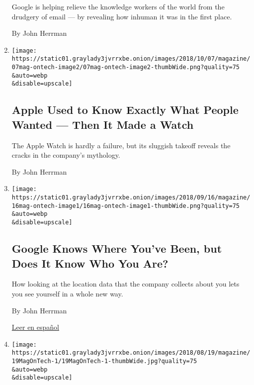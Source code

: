 \begin{enumerate}
  Google is helping relieve the knowledge workers of the world from the
  drudgery of email --- by revealing how inhuman it was in the first
  place.

  By John Herrman
\item
  \href{/2018/10/03/magazine/apple-watch-data-industry.html}{}

  \texttt{[image: https://static01.graylady3jvrrxbe.onion/images/2018/10/07/magazine/07mag-ontech-image2/07mag-ontech-image2-thumbWide.png?quality=75\\\&auto=webp\\\&disable=upscale]}

  \hypertarget{apple-used-to-know-exactly-what-people-wanted--then-it-made-a-watch}{%
  \subsection{Apple Used to Know Exactly What People Wanted --- Then It
  Made a
  Watch}\label{apple-used-to-know-exactly-what-people-wanted--then-it-made-a-watch}}

  The Apple Watch is hardly a failure, but its sluggish takeoff reveals
  the cracks in the company's mythology.

  By John Herrman
\item
  \href{/2018/09/12/magazine/google-maps-location-data-privacy.html}{}

  \texttt{[image: https://static01.graylady3jvrrxbe.onion/images/2018/09/16/magazine/16mag-ontech-image1/16mag-ontech-image1-thumbWide.png?quality=75\\\&auto=webp\\\&disable=upscale]}

  \hypertarget{google-knows-where-youve-been-but-does-it-know-who-you-are}{%
  \subsection{Google Knows Where You've Been, but Does It Know Who You
  Are?}\label{google-knows-where-youve-been-but-does-it-know-who-you-are}}

  How looking at the location data that the company collects about you
  lets you see yourself in a whole new way.

  By John Herrman

  \href{https://www.nytimes3xbfgragh.onion/es/2018/09/13/google-ubicacion-privacidad/}{Leer
  en español}
\item
  \href{/2018/08/15/magazine/twitters-misguided-quest-to-become-a-forum-for-everything.html}{}

  \texttt{[image: https://static01.graylady3jvrrxbe.onion/images/2018/08/19/magazine/19MagOnTech-1/19MagOnTech-1-thumbWide.jpg?quality=75\\\&auto=webp\\\&disable=upscale]}


\end{enumerate}
